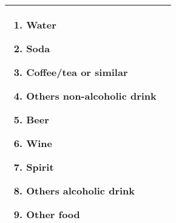 \begin{tabularx}{0.97\textwidth}{XX}
\begin{enumerate}[leftmargin=*]
        \item Water
        \item Soda
        \item Coffee/tea or similar
        \item Others non-alcoholic drink
        \item Beer
        \item Wine
        \item Spirit
        \item Others alcoholic drink
        \item Other food
    \end{enumerate}\\
    \bottomrule
\end{tabularx}